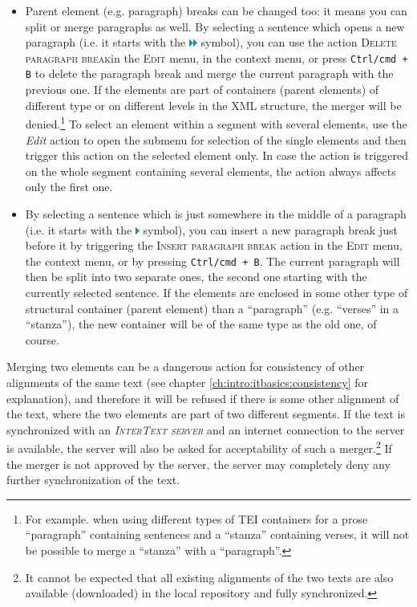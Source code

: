 \documentclass[a4paper,10pt,oneside]{book}
\newcommand{\ITserver}{\textit{\textsc{InterText server}}\xspace}
\newcommand{\keys}[1]{\texttt{#1}}
\newcommand{\menu}[1]{\textsc{#1}}
\begin{document}
\begin{itemize}
 \item Parent element (e.g. paragraph) breaks can be changed too: it means you can split or merge paragraphs as well. By selecting a sentence which opens a new paragraph (i.e. it starts with the \includegraphics[height=1ex]{../images/16/dblarrow.png} symbol), you can use the action \menu{Delete paragraph break}in the \menu{Edit} menu, in the context menu, or press \keys{Ctrl/cmd + B} to delete the paragraph break and merge the current paragraph with the previous one. If the elements are part of containers (parent elements) of different type or on different levels in the XML structure, the merger will be denied.\footnote{For example. when using different types of TEI containers for a prose ``paragraph'' containing sentences and a ``stanza'' containing verses, it will not be possible to merge a ``stanza'' with a ``paragraph''.} To select an element within a segment with several elements, use the \emph{Edit} action to open the submenu for selection of the single elements and then trigger this action on the selected element only. In case the action is triggered on the whole segment containing several elements, the action always affects only the first one.
 \item By selecting a sentence which is just somewhere in the middle of a paragraph (i.e. it starts with the \includegraphics[height=1ex]{../images/16/arrow.png} symbol), you can insert a new paragraph break just before it by triggering the \menu{Insert paragraph break} action in the \menu{Edit} menu, the context menu, or by pressing \keys{Ctrl/cmd + B}. The current paragraph will then be split into two separate ones, the second one starting with the currently selected sentence. If the elements are enclosed in some other type of structural container (parent element) than a ``paragraph'' (e.g. ``verses'' in a ``stanza''), the new container will be of the same type as the old one, of course.
\end{itemize}

Merging two elements can be a dangerous action for consistency of other alignments of the same text (see chapter \ref{ch:intro:itbasics:consistency} for explanation), and therefore it will be refused if there is some other alignment of the text, where the two elements are part of two different segments. If the text is synchronized with an \ITserver and an internet connection to the server is available, the server will also be asked for acceptability of such a merger.\footnote{It cannot be expected that all existing alignments of the two texts are also available (downloaded) in the local repository and fully synchronized.} If the merger is not approved by the server, the server may completely deny any further synchronization of the text.
\end{document}
